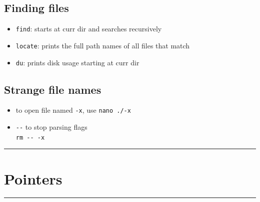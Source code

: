 \documentclass[10pt, multicolumn, a4paper]{article}
\begin{document}
\begin{multicols}{2}
	\subsection*{Finding files}
	\begin{itemize}
	\item \verb|find|: starts at curr dir and searches recursively
	\item \verb|locate|: prints the full path names of all files that match
	\item \verb|du|: prints disk usage starting at curr dir
	\end{itemize}
	\subsection*{Strange file names}
	\begin{itemize}
	\item to open file named \verb|-x|, use \verb|nano ./-x|
	\item \verb|--| to stop parsing flags \\ \verb|rm -- -x|
	\end{itemize}
\end{multicols}


\hrule
\section{Pointers}
\hrule 
\end{document}
